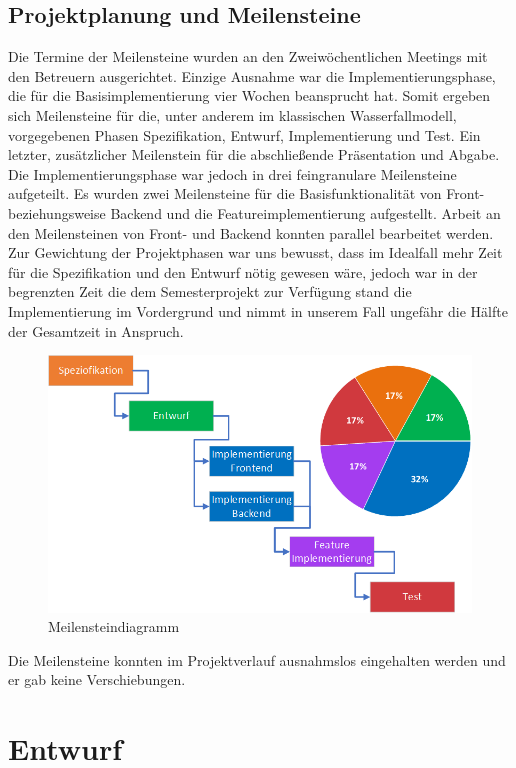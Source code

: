 \subsection{Projektplanung und Meilensteine}
Die Termine der Meilensteine wurden an den Zweiwöchentlichen Meetings mit den Betreuern ausgerichtet. Einzige Ausnahme war die Implementierungsphase, die für die Basisimplementierung vier Wochen beansprucht hat. Somit ergeben sich Meilensteine für die, unter anderem im klassischen Wasserfallmodell, vorgegebenen Phasen Spezifikation, Entwurf, Implementierung und Test. Ein letzter, zusätzlicher Meilenstein für die abschließende Präsentation und Abgabe. Die Implementierungsphase war jedoch in  drei feingranulare Meilensteine aufgeteilt. Es wurden zwei Meilensteine für die Basisfunktionalität von Front- beziehungsweise Backend und die Featureimplementierung aufgestellt. Arbeit an den Meilensteinen von Front- und Backend konnten parallel bearbeitet werden. Zur Gewichtung der Projektphasen war uns bewusst, dass im Idealfall mehr Zeit für die Spezifikation und den Entwurf nötig gewesen wäre, jedoch war in der begrenzten Zeit die dem Semesterprojekt zur Verfügung stand die Implementierung im Vordergrund und nimmt in unserem Fall ungefähr die Hälfte der Gesamtzeit in Anspruch.
\newpage
\begin{figure}[h]
	\centering
	\includegraphics[width=\textwidth]{content/pictures/Phasen_Diagramm.png}
	\caption{Meilensteindiagramm}
	\label{img:milestone}
\end{figure}


Die Meilensteine konnten im Projektverlauf ausnahmslos eingehalten werden und er gab keine Verschiebungen.

\section{Entwurf}
